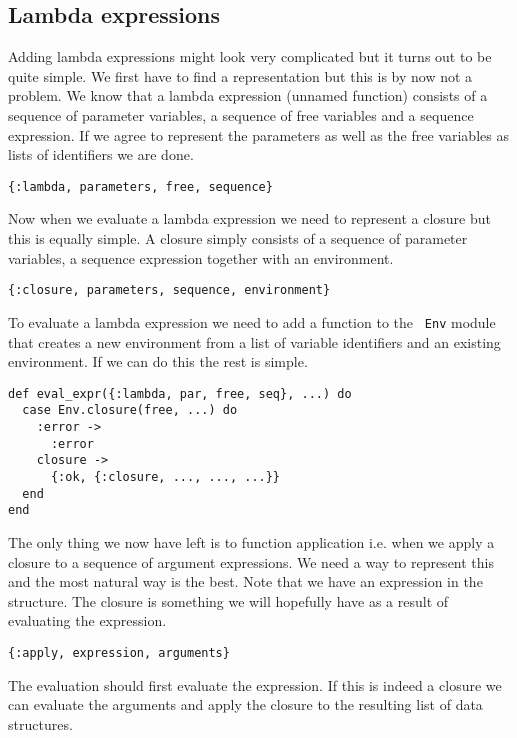 \documentclass[a4paper,11pt]{article}
\begin{document}
\subsection{Lambda expressions}

Adding lambda expressions might look very complicated but it turns out
to be quite simple. We first have to find a representation but this is
by now not a problem. We know that a lambda expression (unnamed
function) consists of a sequence of parameter variables, a sequence of
free variables and a sequence expression. If we agree to represent the
parameters as well as the free variables as lists of identifiers we
are done.

\begin{verbatim}
{:lambda, parameters, free, sequence}
\end{verbatim}

Now when we evaluate a lambda expression we need to represent a
closure but this is equally simple. A closure simply consists of a
sequence of parameter variables, a sequence expression together with an
environment.

\begin{verbatim}
{:closure, parameters, sequence, environment}
\end{verbatim}

To evaluate a lambda expression we need to add a function to the {\tt
  Env} module that creates a new environment from a list of variable
identifiers and an existing environment. If we can do this the rest is
simple.

\begin{verbatim}
def eval_expr({:lambda, par, free, seq}, ...) do
  case Env.closure(free, ...) do
    :error ->
      :error
    closure ->
      {:ok, {:closure, ..., ..., ...}}
  end
end
\end{verbatim}

The only thing we now have left is to function application i.e. when we
apply a closure to a sequence of argument expressions. We need a way
to represent this and the most natural way is the best. Note that we
have an expression in the structure. The closure is something we will
hopefully have as a result of evaluating the expression.

\begin{verbatim}
{:apply, expression, arguments}
\end{verbatim}

The evaluation should first evaluate the expression. If this is indeed
a closure we can evaluate the arguments and apply the closure to the
resulting list of data structures.
\end{document}
